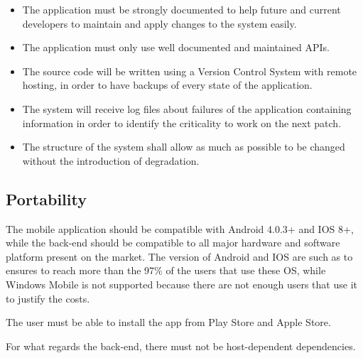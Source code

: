 \begin{itemize}
\item The application must be strongly documented to help future and current developers to maintain and apply changes to the system easily.
\item The application must only use well documented and maintained APIs.
\item The source code will be written using a Version Control System with remote hosting, in order to have backups of every state of the application.
\item The system will receive log files about failures of the application
containing information in order to identify the criticality to work on the next patch.
\item The structure of the system shall allow as much as possible to be changed without the introduction of degradation.
\end{itemize}

\subsection{Portability}
The mobile application should be compatible with Android 4.0.3+ and IOS 8+, while the back-end should be compatible to all major hardware and software platform present on the market.
The version of Android and IOS are such as to ensures to reach more than the 97\% of the users that use these OS, while Windows Mobile is not supported because there are not enough users that use it to justify the costs.

The user must be able to install the app from Play Store and Apple Store.

For what regards the back-end, there must not be host-dependent dependencies.